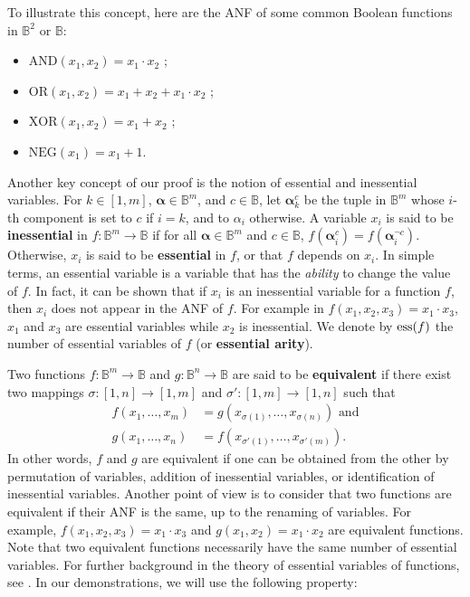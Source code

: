 \begin{testexample}
To illustrate this concept, here are
the ANF of some common Boolean functions in $\mathbb{B}^2$ or $\mathbb{B}$:

\begin{itemize}
  \item $\text{AND}(x_1, x_2) = x_1 \cdot x_2$ ;
  \item $\text{OR}(x_1, x_2) = x_1 + x_2 + x_1 \cdot x_2$ ;
  \item $\text{XOR}(x_1, x_2) = x_1 + x_2$ ;
  \item $\text{NEG}(x_1) = x_1 + 1$.
\end{itemize}
\end{testexample}

Another key concept of our proof is the notion of essential and inessential
variables.  For $k\in [1,m]$, $\boldsymbol{\alpha}\in \mathbb{B}^m$, and $c \in
\mathbb{B}$, let ${\boldsymbol{\alpha}}_{k}^c$ be the tuple in $\mathbb{B}^{m}$
whose $i$-th component is set to $c$ if $i=k$, and to $\alpha_i$ otherwise.  A
variable $x_i$ is said to be \textbf{inessential} in $f\colon \mathbb{B}^m\to
\mathbb{B}$ if for all $\boldsymbol{\alpha} \in \mathbb{B}^m$ and $c \in
\mathbb{B}$, $f(\boldsymbol{\alpha}^c_i) = f(\boldsymbol{\alpha}^{\neg c}_i)$.
Otherwise, $x_i$ is said to be \textbf{essential} in $f$, or that $f$ depends
on $x_i$. In simple terms, an essential variable is a variable that has the
\textit{ability} to change the value of $f$. In fact, it can be shown that if
$x_i$ is an inessential variable for a function $f$, then $x_i$ does not appear
in the ANF of $f$.  For example in $f(x_1, x_2, x_3) = x_1 \cdot x_3$, $x_1$
and $x_3$ are essential variables while $x_2$ is inessential.  We denote by
$\operatorname{ess}(f)$ the number of essential variables of $f$ (or \textbf{essential
arity}).

Two functions $f\colon \mathbb{B}^m\to \mathbb{B}$ and $g\colon \mathbb{B}^n\to
\mathbb{B}$ are said to be {\bf equivalent} if there exist two mappings
$\sigma\colon
[1,n]\to [1,m]$ and $\sigma'\colon [1,m]\to [1,n]$ such that
\begin{align*}
  f(x_1,\ldots , x_m)&=g(x_{\sigma(1)},\ldots,x_{\sigma(n)}) \text{ and} \\
   g(x_1,\ldots , x_n)&=f(x_{\sigma'(1)},\ldots,x_{\sigma'(m)}).
\end{align*}
In other words, $f$ and $g$ are equivalent if one can be obtained from the
other by permutation of variables, addition of inessential variables, or
identification of inessential variables. Another point of view is to consider
that two functions are equivalent if their ANF is the same, up to the
renaming of variables. For example, $f(x_1, x_2, x_3) = x_1
\cdot x_3$ and $g(x_1, x_2)  = x_1 \cdot x_2$ are equivalent functions. Note
that two equivalent functions necessarily have the same number of essential
variables. For further background in the theory of essential variables of
functions, see \cite{CouceiroTCS08, CouceiroDM09, SalomaaAASF63, WillardDM96}.
In our demonstrations, we will use the following property:

